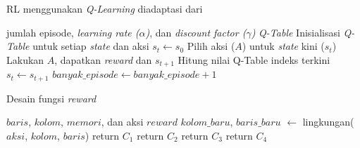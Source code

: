 \begin{algorithm}
	\makeatletter
	\renewcommand{\ALG@name}{Algoritma}
	\makeatother
	\caption{\ac{RL} menggunakan \textit{Q-Learning} diadaptasi dari \parencite{sutisna2023faraneq}}\label{alg:rl-qlearning}
	\renewcommand{\algorithmicrequire}{\textbf{Masukan:}}
	\renewcommand{\algorithmicensure}{\textbf{Keluaran:}}
	\begin{algorithmic}[1]
		\Require jumlah episode, \textit{learning rate ($\alpha$)}, dan \textit{discount factor ($\gamma$)}
		\Ensure \textit{Q-Table}
		\State Inisialisasi \textit{Q-Table} untuk setiap \textit{state} dan aksi
		\State $s_{t} \gets s_0$
		\State Pilih aksi ($A$) untuk \textit{state} kini ($s_t$)
		\State Lakukan $A$, dapatkan \textit{reward} dan $s_{t+1}$ \label{algline:q-reward}
		\State Hitung nilai Q-Table indeks terkini 
		\State $s_t \gets s_{t+1}$
		\EndWhile
		\State $banyak\_episode \gets banyak\_episode + 1$
		\EndWhile
	\end{algorithmic}
\end{algorithm}

\begin{algorithm}
	\makeatletter
	\renewcommand{\ALG@name}{Algoritma}
	\makeatother
	\caption{Desain fungsi \textit{reward}}\label{alg:rl-reward-function}
	\renewcommand{\algorithmicrequire}{\textbf{Masukan:}}
	\renewcommand{\algorithmicensure}{\textbf{Keluaran:}}
	\begin{algorithmic}[1]
		\Require $baris$, $kolom$, $memori$, dan aksi
		\Ensure $reward$
		\State $kolom\_baru$, $baris\_baru$ $\gets$ lingkungan($aksi$, $kolom$, $baris$)
		 \label{algline:reward-c1}
		\State return $C_1$
		\EndIf
		 \label{algline:reward-c2}
		\State return $C_2$
		\EndIf
		 \label{algline:reward-c3}
		\State return $C_3$
		\EndIf
		\State return $C_4$ \label{algline:reward-c4}
	\end{algorithmic}
\end{algorithm}

